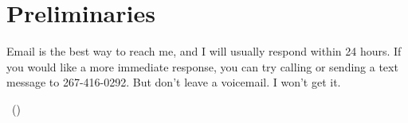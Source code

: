 \vspace*{.75cm}
\begin{flushleft}
\textsf{\subtitle~~$\cdot$~~\semester\\
\vspace{.75cm}
\vspace{3mm}
\mytitle\\
\vspace{5mm}
\normalsize{\myauthor}\\
\myemail\\}
\vspace{1.5mm}
\end{flushleft}
\vspace{15mm}

\section{Preliminaries}

\noindent Email is the best way to reach me, and I will usually respond within 24 hours. If you would like a more immediate response, you can try calling or sending a text message to 267-416-0292. But don’t leave a voicemail. I won’t get it.
 
\vspace{2mm}
\noindent \meeting ~(\myaddress)

